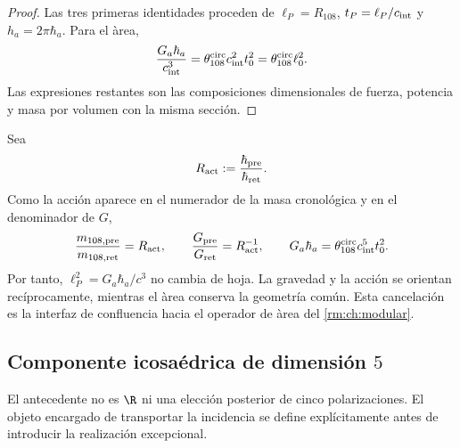 \begin{proof}
Las tres primeras identidades proceden de
\(\ell_P=R_{108}\), \(t_P=\ell_P/c_{\rm int}\) y
\(h_a=2\pi\hbar_a\). Para el \`area,
\[
\frac{G_a\hbar_a}{c_{\rm int}^3}
=\theta_{108}^{\rm circ}c_{\rm int}^2t_0^2
=\theta_{108}^{\rm circ}\ell_0^2.
\]
Las expresiones restantes son las composiciones dimensionales de fuerza,
potencia y masa por volumen con la misma secci\'on.
\end{proof}

Sea
\begin{equation}
\label{rm:eq:gravity-Ract}
R_{\rm act}:=\frac{\hbar_{\rm pre}}{\hbar_{\rm ret}}.
\end{equation}
Como la acci\'on aparece en el numerador de la masa cronol\'ogica y en el
denominador de \(G\),
\begin{equation}
\label{rm:eq:gravity-twoway-covariance}
\frac{m_{108,\rm pre}}{m_{108,\rm ret}}=R_{\rm act},
\qquad
\frac{G_{\rm pre}}{G_{\rm ret}}=R_{\rm act}^{-1},
\qquad
G_a\hbar_a
=\theta_{108}^{\rm circ}c_{\rm int}^5t_0^2.
\end{equation}
Por tanto, \(\ell_P^2=G_a\hbar_a/c^3\) no cambia de hoja. La gravedad y
la acci\'on se orientan rec\'iprocamente, mientras el \`area conserva la
geometr\'ia com\'un. Esta cancelaci\'on es la interfaz de confluencia hacia el operador de
\`area del \cref{rm:ch:modular}.

\subsection{Componente icosaédrica de dimensión \(5\)}

El antecedente no es \(\R\) ni una elecci\'on posterior de cinco
polarizaciones. El objeto encargado de transportar la incidencia se define
expl\'icitamente antes de introducir la realizaci\'on excepcional.

